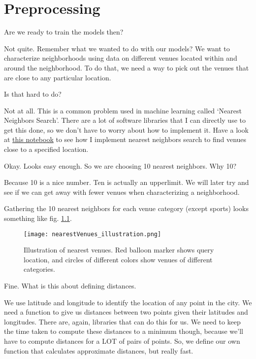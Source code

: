\chapter{Preprocessing}\label{chap:preprocessing}

{\color{blue} Are we ready to train the models then? }

Not quite. Remember what we wanted to do with our models? We want to characterize neighborhoods using data on different venues located within and around the neighborhood. To do that, we need a way to pick out the venues that are close to any particular location. 

{\color{blue} Is that hard to do?}

Not at all. This is a common problem used in machine learning called `Nearest Neighbors Search'. There are a lot of software libraries that I can directly use to get this done, so we don't have to worry about how to implement it. Have a look at \href{https://github.com/saba-vadarevu/IBM-dataScience-Capstone/blob/master/final/preprocessing.ipynb}{this notebook} to see how I implement nearest neighbors search to find venues close to a specified location. 

{\color{blue} Okay. Looks easy enough. So we are choosing 10 nearest neighbors. Why 10?}

Because 10 is a nice number. Ten is actually an upperlimit. We will later try and see if we can get away with fewer venues when characterizing a neighborhood. 

Gathering the 10 nearest neighbors for each venue category (except sports) looks something like fig. \ref{fig:nearest-neighbors}.

\begin{figure}
	\centering
	\texttt{[image: nearestVenues\_illustration.png]}
	\caption{Illustration of nearest venues. Red balloon marker shows query location, and circles of different colors show venues of different categories. \label{fig:nearest-neighbors}}
\end{figure}


{\color{blue} Fine. What is this about defining distances.}

We use latitude and longitude to identify the location of any point in the city. We need a function to give us distances between two points given their latitudes and longitudes. There are, again, libraries that can do this for us. We need to keep the time taken to compute these distances to a minimum though, because we'll have to compute distances for a LOT of pairs of points. So, we define our own function that calculates approximate distances, but really fast. 


